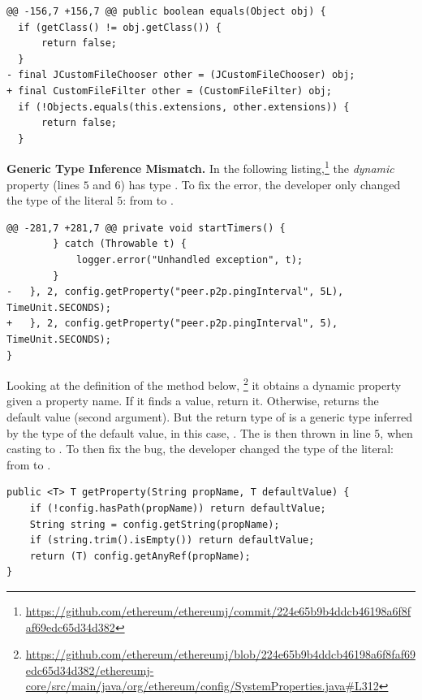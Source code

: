 \begin{lstlisting}[style=java]
@@ -156,7 +156,7 @@ public boolean equals(Object obj) {
  if (getClass() != obj.getClass()) {
      return false;
  }
- final JCustomFileChooser other = (JCustomFileChooser) obj;
+ final CustomFileFilter other = (CustomFileFilter) obj;
  if (!Objects.equals(this.extensions, other.extensions)) {
      return false;
  }
\end{lstlisting}

\textbf{Generic Type Inference Mismatch.}
In the following listing,\footnote{\url{https://github.com/ethereum/ethereumj/commit/224e65b9b4ddcb46198a6f8faf69edc65d34d382}}
the \emph{dynamic} property  (lines $5$ and $6$) has type .
To fix the error, the developer only changed the type of the literal $5$: from  to .

\begin{lstlisting}[style=java]
@@ -281,7 +281,7 @@ private void startTimers() {
        } catch (Throwable t) {
            logger.error("Unhandled exception", t);
        }
-   }, 2, config.getProperty("peer.p2p.pingInterval", 5L), TimeUnit.SECONDS);
+   }, 2, config.getProperty("peer.p2p.pingInterval", 5), TimeUnit.SECONDS);
}
\end{lstlisting}

Looking at the definition of the  method below,%
\footnote{\url{https://github.com/ethereum/ethereumj/blob/224e65b9b4ddcb46198a6f8faf69edc65d34d382/ethereumj-core/src/main/java/org/ethereum/config/SystemProperties.java\#L312}}
it obtains a dynamic property given a property name.
If it finds a value, return it.
Otherwise, returns the default value (second argument).
But the return type of 
is a generic type inferred by the type of the default value, in this case, .
The  is then thrown in line $5$, when casting  to .
To then fix the bug, the developer changed the type of the literal: from  to .


\begin{lstlisting}[style=java]
public <T> T getProperty(String propName, T defaultValue) {
    if (!config.hasPath(propName)) return defaultValue;
    String string = config.getString(propName);
    if (string.trim().isEmpty()) return defaultValue;
    return (T) config.getAnyRef(propName);
}
\end{lstlisting}

